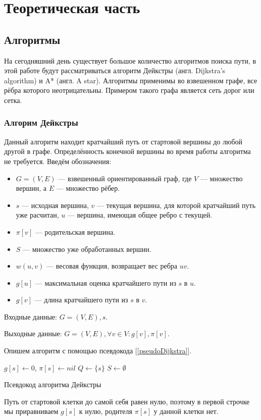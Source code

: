 \section{Теоретическая часть}
\subsection{Алгоритмы}
На сегодняшний день существует большое количество алгоритмов поиска пути, в этой работе будут рассматриваться алгоритм Дейкстры (англ. Dijkstra’s algorithm) и A* (англ. A star). Алгоритмы применимы во взвешенном графе, все рёбра которого неотрицательны. Примером такого графа является сеть дорог или сетка. 
\subsubsection{Алгорим Дейкстры}
Данный алгоритм находит кратчайший путь от стартовой вершины до любой другой в графе. Определённость конечной вершины во время работы алгоритма не требуется.
Введём обозначения:
\begin{itemize}
    \item $G = (V,E)$ — взвешенный ориентированный граф, где $V$ — множество вершин, а $E$ — множество рёбер.
    \item $s$ — исходная вершина, $v$ — текущая вершина, для которой кратчайший путь уже расчитан, $u$ — вершина, имеющая общее ребро с текущей.
    \item $\pi[v]$ — родительская вершина.
    \item $S$ — множество уже обработанных вершин.
    \item $w(u,v)$ — весовая функция, возвращает вес ребра $uv$.
    \item $g[u]$ — максимальная оценка кратчайшего пути из $s$ в $u$.
    \item $g[v]$ — длина кратчайшего пути из $s$ в $v$.

\end{itemize}

Входные данные: $G = (V,E), s$.

Выходные данные: $G = (V,E),  \forall v \in V: g[v],\pi[v]$.

Опишем алгоритм с помощью псевдокода [\ref{pseudoDijkstra}].

\begin{algorithm}

\DontPrintSemicolon
$g[s]\gets 0$, $\pi[s] \gets nil$\;
$Q \gets \{s\}$\;
$S \gets \emptyset$\;


\caption{Псевдокод алгоритма Дейкстры}
\label{pseudoDijkstra}
\end{algorithm}
Путь от стартовой клетки до самой себя равен нулю, поэтому в первой строчке мы приравниваем $g[s]$ к нулю, родителя $\pi[s]$ у данной клетки нет.

